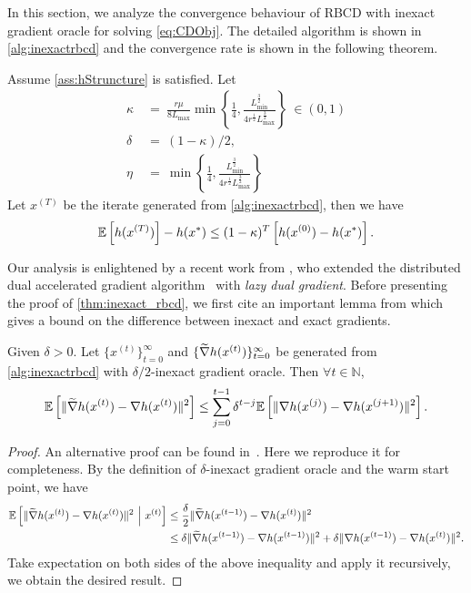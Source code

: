 In this section, we analyze the convergence behaviour of RBCD with inexact gradient oracle for solving \autoref{eq:CDObj}. The detailed algorithm is shown in \autoref{alg:inexactrbcd} and the convergence rate is shown in the following theorem. 
\begin{theorem} \label{thm:inexact_rbcd}
    Assume \autoref{ass:hStruncture} is satisfied. Let
    \begin{align}
        \kappa &~=~ \frac{ r \mu }{ 8 L_{\max}} \min \left\{ \frac{1}{4}, \frac{L_{\min}^{\frac{3}{2}}}{4 r^{\frac{1}{2}} L_{\max}^{\frac{3}{2}} } \right\} ~\in (0,1) \nonumber \\
        \delta &~=~ (1-\kappa) / 2, \nonumber \\
        \eta &~=~ \min \left\{ \frac{1}{4}, \frac{L_{\min}^{\frac{3}{2}}}{4 r^{\frac{1}{2}} L_{\max}^{\frac{3}{2}} } \right\}
    \end{align} 
    Let $x^{(T)}$ be the iterate generated from \autoref{alg:inexactrbcd}, then we have 
    \[\mathbb{E}\left[h(x^{(T)})\right] - h(x^*) \leq (1-\kappa)^T\left[h(x^{(0)}) - h(x^*) \right]. \]
\end{theorem}

Our analysis is enlightened by a recent work from \citet{LiuSY21}, who extended the distributed dual accelerated gradient algorithm~\citep{Scaman2017OptimalAF} with \emph{lazy dual gradient}. Before presenting the proof of \autoref{thm:inexact_rbcd}, we first cite an important lemma from \citep{LiuSY21} which gives a bound on the difference between inexact and exact gradients. 
\begin{lemma} \label{lemma:LiuLemma1}
    Given $\delta > 0$. Let $\{ x^{(t)} \}_{t=0}^{\infty}$ and $\{ \widetilde{\nabla} h(x^{(t)}) \}_{t=0}^{\infty}$ be generated from \autoref{alg:inexactrbcd} with $\delta/2$-inexact gradient oracle. Then $\forall t \in \mathbb{N}$,
    \begin{align}
        \mathbb{E}\left[\| \widetilde{\nabla} h(x^{(t)}) - {\nabla} h(x^{(t)}) \|^2 \right] \leq \sum_{j=0}^{t-1} \delta^{t-j} \mathbb{E} \left[ \| \nabla h(x^{(j)}) - {\nabla} h(x^{(j+1)}) \|^2 \right]. \label{eq:recursiveGradDiff}
    \end{align}
\end{lemma}
\begin{proof}
An alternative proof can be found in~\citet[Appendix A]{LiuSY21}. Here we reproduce it for completeness. By the definition of $\delta$-inexact gradient oracle and the warm start point, we have
\begin{align*}
    \mathbb{E}\left[\| \widetilde{\nabla} h(x^{(t)}) - {\nabla} h(x^{(t)}) \|^2 ~\Big|~ x^{(t)} \right] &\leq \frac{\delta}{2} \| \widetilde{\nabla} h(x^{(t-1)}) - {\nabla} h(x^{(t)}) \|^2 \\
    &\leq \delta \| \widetilde{\nabla} h(x^{(t-1)}) - {\nabla} h(x^{(t-1)}) \|^2 + \delta \| {\nabla} h(x^{(t-1)}) - {\nabla} h(x^{(t)}) \|^2 .
\end{align*}
Take expectation on both sides of the above inequality and apply it recursively, we obtain the desired result.
\end{proof}

